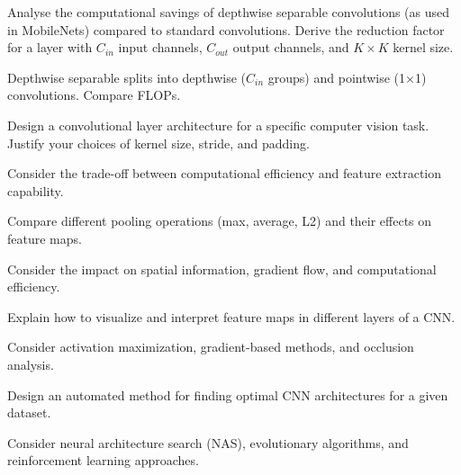 \begin{exercisebox}[hard]
\begin{problem}
Analyse the computational savings of depthwise separable convolutions (as used in MobileNets) compared to standard convolutions. Derive the reduction factor for a layer with $C_{in}$ input channels, $C_{out}$ output channels, and $K×K$ kernel size.
\end{problem}
\begin{hintbox}
Depthwise separable splits into depthwise ($C_{in}$ groups) and pointwise (1×1) convolutions. Compare FLOPs.
\end{hintbox}
\end{exercisebox}


\begin{exercisebox}[hard]
\begin{problem}
Design a convolutional layer architecture for a specific computer vision task. Justify your choices of kernel size, stride, and padding.
\end{problem}
\begin{hintbox}
Consider the trade-off between computational efficiency and feature extraction capability.
\end{hintbox}
\end{exercisebox}


\begin{exercisebox}[hard]
\begin{problem}
Compare different pooling operations (max, average, L2) and their effects on feature maps.
\end{problem}
\begin{hintbox}
Consider the impact on spatial information, gradient flow, and computational efficiency.
\end{hintbox}
\end{exercisebox}


\begin{exercisebox}[hard]
\begin{problem}
Explain how to visualize and interpret feature maps in different layers of a CNN.
\end{problem}
\begin{hintbox}
Consider activation maximization, gradient-based methods, and occlusion analysis.
\end{hintbox}
\end{exercisebox}


\begin{exercisebox}[hard]
\begin{problem}
Design an automated method for finding optimal CNN architectures for a given dataset.
\end{problem}
\begin{hintbox}
Consider neural architecture search (NAS), evolutionary algorithms, and reinforcement learning approaches.
\end{hintbox}
\end{exercisebox}


